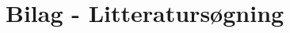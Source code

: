 \documentclass[main.tex]{subfiles}
\begin{document}
\chapter*{Bilag - Litteratursøgning}
\end{document}
